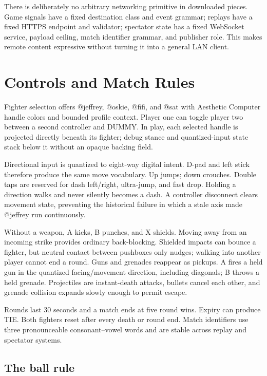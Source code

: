 \documentclass[10pt,letterpaper,twocolumn]{article}
\begin{document}
There is deliberately no arbitrary networking primitive in downloaded pieces. Game signals have a fixed destination class and event grammar; replays have a fixed HTTPS endpoint and validator; spectator state has a fixed WebSocket service, payload ceiling, match identifier grammar, and publisher role. This makes remote content expressive without turning it into a general LAN client.

\section{Controls and Match Rules}

Fighter selection offers @jeffrey, @oskie, @fifi, and @sat with Aesthetic Computer handle colors and bounded profile context. Player one can toggle player two between a second controller and \textsc{DUMMY}. In play, each selected handle is projected directly beneath its fighter; debug stance and quantized-input state stack below it without an opaque backing field.

Directional input is quantized to eight-way digital intent. D-pad and left stick therefore produce the same move vocabulary. Up jumps; down crouches. Double taps are reserved for dash left/right, ultra-jump, and fast drop. Holding a direction walks and never silently becomes a dash. A controller disconnect clears movement state, preventing the historical failure in which a stale axis made @jeffrey run continuously.

Without a weapon, A kicks, B punches, and X shields. Moving away from an incoming strike provides ordinary back-blocking. Shielded impacts can bounce a fighter, but neutral contact between pushboxes only nudges; walking into another player cannot end a round. Guns and grenades reappear as pickups. A fires a held gun in the quantized facing/movement direction, including diagonals; B throws a held grenade. Projectiles are instant-death attacks, bullets cancel each other, and grenade collision expands slowly enough to permit escape.

Rounds last 30 seconds and a match ends at five round wins. Expiry can produce \textsc{TIE}. Both fighters reset after every death or round end. Match identifiers use three pronounceable consonant--vowel words and are stable across replay and spectator systems.

\subsection{The ball rule}
\end{document}
